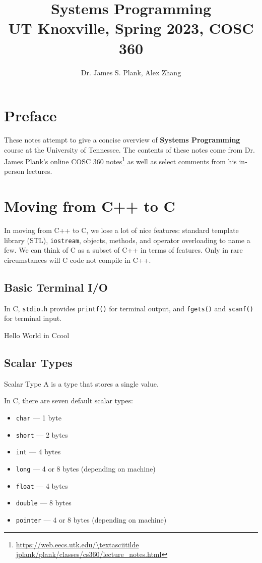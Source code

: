 \documentclass[code]{amznotes}
\title{\textbf{Systems Programming}\\
\large UT Knoxville, Spring 2023, COSC 360}
\author{Dr. James S. Plank, Alex Zhang}
\begin{document}
\maketitle
\tableofcontents

\chapter*{Preface}
These notes attempt to give a concise overview of \textbf{Systems Programming} course at the University of Tennessee. The contents of these notes come from Dr. James Plank's online COSC 360 notes\footnote{\url{https://web.eecs.utk.edu/\textasciitilde jplank/plank/classes/cs360/lecture\_notes.html}} as well as select comments from his in-person lectures.

\chapter{Moving from C++ to C}
In moving from C++ to C, we lose a lot of nice features: standard template library (STL), \texttt{iostream}, objects, methods, and operator overloading to name a few. We can think of C as a subset of C++ in terms of features. Only in rare circumstances will C code not compile in C++.

\section{Basic Terminal I/O}
In C, \texttt{stdio.h} provides \texttt{printf()} for terminal output, and \texttt{fgets()} and \texttt{scanf()} for terminal input.

\begin{codebox}{Hello World in C}{cool}
\end{codebox}

\section{Scalar Types}

\begin{dfnbox}{Scalar Type}{}
    A  is a type that stores a single value.
\end{dfnbox}

In C, there are seven default scalar types:
\begin{itemize}
    \item \texttt{char} --- 1 byte
    \item \texttt{short} --- 2 bytes
    \item \texttt{int} --- 4 bytes
    \item \texttt{long} --- 4 or 8 bytes (depending on machine)
    \item \texttt{float} --- 4 bytes
    \item \texttt{double} --- 8 bytes
    \item \texttt{pointer} --- 4 or 8 bytes (depending on machine)
\end{itemize}
\end{document}
